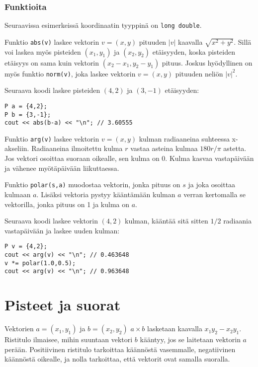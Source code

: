 \subsubsection*{Funktioita}

Seuraavissa esimerkeissä koordinaatin tyyppinä on
\texttt{long double}.

Funktio \texttt{abs(v)} laskee vektorin $v=(x,y)$
pituuden $|v|$ kaavalla $\sqrt{x^2+y^2}$.
Sillä voi laskea myös pisteiden $(x_1,y_1)$
ja $(x_2,y_2)$ etäisyyden,
koska pisteiden etäisyys
on sama kuin vektorin $(x_2-x_1,y_2-y_1)$ pituus.
Joskus hyödyllinen on myös funktio \texttt{norm(v)},
joka laskee vektorin $v=(x,y)$ pituuden neliön $|v|^2$.

Seuraava koodi laskee
pisteiden $(4,2)$ ja $(3,-1)$ etäisyyden:
\begin{lstlisting}
P a = {4,2};
P b = {3,-1};
cout << abs(b-a) << "\n"; // 3.60555
\end{lstlisting}

Funktio \texttt{arg(v)} laskee vektorin $v=(x,y)$
kulman radiaaneina suhteessa x-akseliin.
Radiaaneina ilmoitettu kulma $r$ vastaa asteina
kulmaa $180  r/\pi$ astetta.
Jos vektori osoittaa suoraan oikealle,
sen kulma on 0.
Kulma kasvaa vastapäivään ja vähenee myötäpäivään
liikuttaessa.

Funktio \texttt{polar(s,a)} muodostaa vektorin,
jonka pituus on $s$ ja joka osoittaa kulmaan $a$.
Lisäksi vektoria pystyy kääntämään kulman $a$
verran kertomalla se vektorilla,
jonka pituus on 1 ja kulma on $a$.

Seuraava koodi laskee vektorin $(4,2)$ kulman,
kääntää sitä sitten $1/2$ radiaania vastapäivään
ja laskee uuden kulman:

\begin{lstlisting}
P v = {4,2};
cout << arg(v) << "\n"; // 0.463648
v *= polar(1.0,0.5);
cout << arg(v) << "\n"; // 0.963648
\end{lstlisting}

\section{Pisteet ja suorat}

Vektorien
$a=(x_1,y_1)$ ja $b=(x_2,y_2)$  $a \times b$
lasketaan kaavalla $x_1 y_2 - x_2 y_1$.
Ristitulo ilmaisee, mihin suuntaan vektori $b$
kääntyy, jos se laitetaan vektorin $a$ perään.
Positiivinen ristitulo tarkoittaa käännöstä vasemmalle,
negatiivinen käännöstä oikealle, ja nolla tarkoittaa,
että vektorit ovat samalla suoralla.

